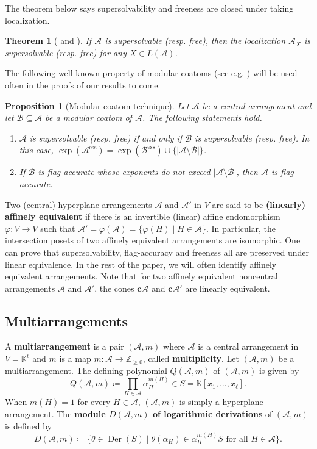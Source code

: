 \documentclass[11pt]{article}
\newtheorem{proposition}[theo]{Proposition}
\newtheorem{theorem}[theo]{Theorem}
\theoremstyle{definition}
\numberwithin{equation}{section}
\DeclareMathOperator{\Der}{Der}
\newcommand{\A}{\mathcal{A}}
\newcommand{\B}{\mathcal{B}}
\newcommand{\Z}{\mathbb{Z}}
\newcommand{\K}{\mathbb{K}}
\newcommand{\cc}{\mathbf{c}}
\newcommand{\tbf}{\textbf}
\begin{document}
 The theorem below says supersolvability and freeness are closed under taking localization. 
 
  \begin{theorem}[{\cite[Proposition 3.2]{St72}} and  {\cite[Theorem 4.37]{OT92}}]
 \label{thm:localization-ss-free}
 If $\A$ is  supersolvable (resp. free), then the localization $\A_X$ is  supersolvable (resp. free) for  any $X \in L(\A)$.
 \end{theorem}

 
The following well-known property of modular coatoms (see e.g. \cite[Proposition 3.3]{MRT24}) will be used often in the proofs of our results to come.
 \begin{proposition}[Modular coatom technique] 
 \label{prop:modular coatom}
 Let $\A$ be a central arrangement and let  $\B\subseteq \A$ be a modular coatom of $\A$. 
The following statements hold.
\begin{enumerate}[(1)]
\item $ \mathcal{A} $ is supersolvable (resp. free) if and only if $ \B $ is supersolvable (resp. free).
In this case, $ \exp (\A^{\mathrm{ess}}) = \exp (\B^{\mathrm{ess}} ) \cup \{|\mathcal{A}\setminus\B|\} $. 
\item  If  $\B$ is flag-accurate whose exponents do not exceed  $|\A\setminus\B|$, then $ \A $ is flag-accurate.
\end{enumerate}
\end{proposition}
 

Two (central) hyperplane arrangements $\A$ and $\A'$ in $V$ are said to be \textbf{(linearly) affinely equivalent} if there is an invertible (linear) affine endomorphism $\varphi: V \to V$ such that $\A'=\varphi(\A)=\{\varphi(H)\mid H\in \A\}$. 
In particular, the intersection posets of two affinely equivalent arrangements are isomorphic. 
One can prove that supersolvability, flag-accuracy and freeness all are preserved under linear equivalence. 
In the rest of the paper, we will often identify affinely equivalent arrangements. 
Note that for  two  affinely equivalent noncentral arrangements $\A$ and $\A'$, the cones $\cc\A$ and $\cc\A'$ are linearly equivalent. 

\subsection{Multiarrangements}
\label{subsec:multi}
A \tbf{multiarrangement} is a pair $(\A, m)$ where $\A$ is a central arrangement in $V=\K^\ell$ and $m$ is a map $m : \A \to \Z_{\ge0}$, called \tbf{multiplicity}. 
Let $(\A, m)$ be a multiarrangement.
The defining polynomial $Q(\A,m)$ of $(\A, m)$ is given by 
$$Q(\A,m) \coloneqq  \prod_{H \in \A} \alpha^{m(H)}_H \in S= \mathbb{K}[x_{1}, \dots, x_{\ell}].$$
When $m(H) = 1$ for every $H \in \A$, $(\A,m)$ is simply a hyperplane arrangement. 
The \tbf{module $D(\A,m)$ of logarithmic derivations} of  $(\A, m)$ is defined by
$$D(\A,m) \coloneqq   \{ \theta\in \Der(S) \mid \theta(\alpha_H) \in \alpha^{m(H)}_HS \mbox{ for all } H \in \A\}.$$
\end{document}
